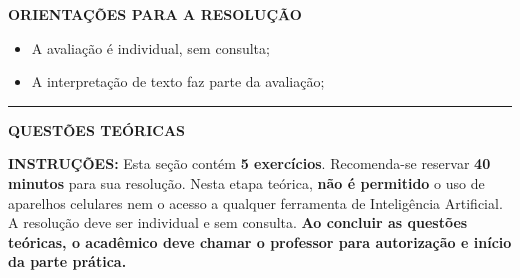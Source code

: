 \documentclass[12pt,a4paper]{article}
\begin{document}
\textbf{ORIENTAÇÕES PARA A RESOLUÇÃO}  

\begin{itemize}
    \item A avaliação é individual, sem consulta;
    \item A interpretação de texto faz parte da avaliação;
\end{itemize}

\vspace{0.5cm}

\begin{center}
    \rule{\textwidth}{0.4pt}
    \textbf{QUESTÕES TEÓRICAS}
\end{center}

\vspace{0.2cm}

\textbf{INSTRUÇÕES:} Esta seção contém \textbf{5 exercícios}. Recomenda-se reservar \textbf{40 minutos} para sua resolução. Nesta etapa teórica, \textbf{não é permitido} o uso de aparelhos celulares nem o acesso a qualquer ferramenta de Inteligência Artificial. A resolução deve ser individual e sem consulta. \textbf{Ao concluir as questões teóricas, o acadêmico deve chamar o professor para autorização e início da parte prática.}

\vspace{0.3cm}
\end{document}
